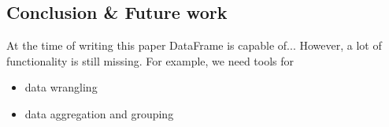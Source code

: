 \documentclass{article}
\begin{document}
\begin{multicols}{2}
%
%


%

\section{Conclusion \& Future work}
\label{sec:conclusion}
At the time of writing this paper DataFrame is capable of...
However, a lot of functionality is still missing. For example, we need tools for
\begin{itemize}
  \item data wrangling
  \item data aggregation and grouping
\end{itemize}





%


% 
% 

% 




%
\end{multicols}
\end{document}
